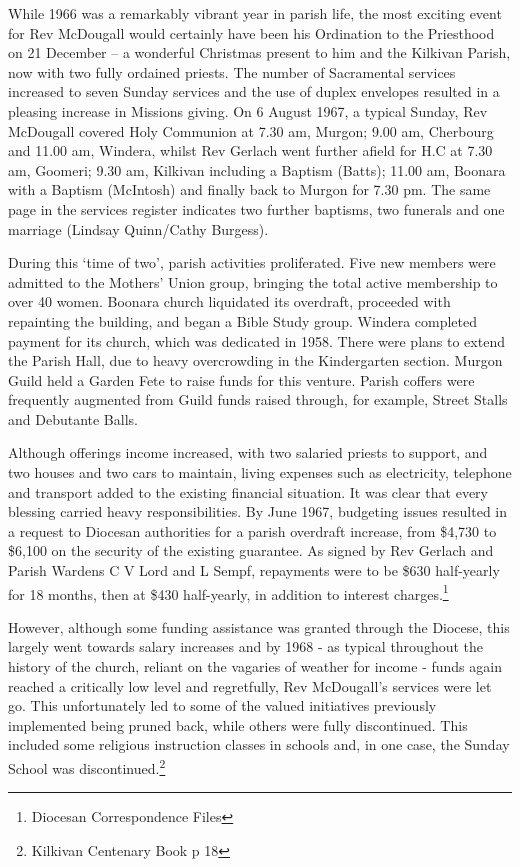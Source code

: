 While 1966 was a remarkably vibrant year in parish life, the most exciting event for Rev McDougall would certainly have been his Ordination to the Priesthood on 21 December -- a wonderful Christmas present to him and the Kilkivan Parish, now with two fully ordained priests. The number of Sacramental services increased to seven Sunday services and the use of duplex envelopes resulted in a pleasing increase in Missions giving. On 6 August 1967, a typical Sunday, Rev McDougall covered Holy Communion at 7.30 am, Murgon; 9.00 am, Cherbourg and 11.00 am, Windera, whilst Rev Gerlach went further afield for H.C at 7.30 am, Goomeri; 9.30 am, Kilkivan including a Baptism (Batts); 11.00 am, Boonara with a Baptism (McIntosh) and finally back to Murgon for 7.30 pm. The same page in the services register indicates two further baptisms, two funerals and one marriage (Lindsay Quinn/Cathy Burgess).



During this `time of two', parish activities proliferated. Five new members were admitted to the Mothers' Union group, bringing the total active membership to over 40 women. Boonara church liquidated its overdraft, proceeded with repainting the building, and began a Bible Study group. Windera completed payment for its church, which was dedicated in 1958. There were plans to extend the Parish Hall, due to heavy overcrowding in the Kindergarten section. Murgon Guild held a Garden Fete to raise funds for this venture. Parish coffers were frequently augmented from Guild funds raised through, for example, Street Stalls and Debutante Balls.



Although offerings income increased, with two salaried priests to support, and two houses and two cars to maintain, living expenses such as electricity, telephone and transport added to the existing financial situation. It was clear that every blessing carried heavy responsibilities. By June 1967, budgeting issues resulted in a request to Diocesan authorities for a parish overdraft increase, from \$4,730 to \$6,100 on the security of the existing guarantee. As signed by Rev Gerlach and Parish Wardens C V Lord and L Sempf, repayments were to be \$630 half-yearly for 18 months, then at \$430 half-yearly, in addition to interest charges.\footnote{Diocesan Correspondence Files}


However, although some funding assistance was granted through the Diocese, this largely went towards salary increases and by 1968 - as typical throughout the history of the church, reliant on the vagaries of weather for income - funds again reached a critically low level and regretfully, Rev McDougall's services were let go. This unfortunately led to some of the valued initiatives previously implemented being pruned back, while others were fully discontinued. This included some religious instruction classes in schools and, in one case, the Sunday School was discontinued.\footnote{Kilkivan Centenary Book p 18}


